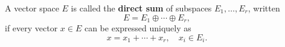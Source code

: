 A vector space $E$ is called the \textbf{direct sum} of subspaces $E_1, \ldots, E_r$, written
$$E = E_1 \oplus \cdots \oplus E_r,$$
if every vector $x \in E$ can be expressed uniquely as
$$x = x_1 + \cdots + x_r, \quad x_i \in E_i.$$
